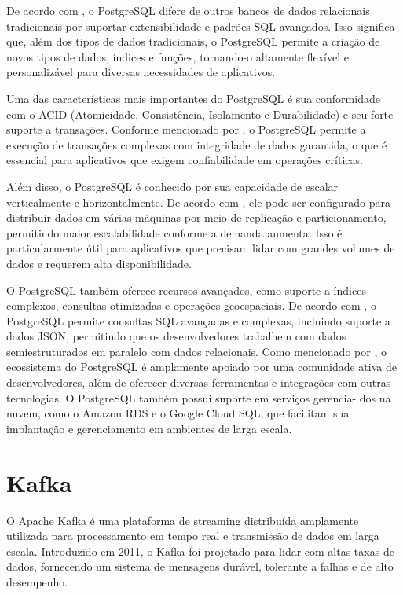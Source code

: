 De acordo com \cite{Momjian2001}, o PostgreSQL difere de outros bancos de dados
relacionais tradicionais por suportar extensibilidade e padrões SQL avançados. Isso significa que,
além dos tipos de dados tradicionais, o PostgreSQL permite a criação de novos tipos de dados,
índices e funções, tornando-o altamente flexível e personalizável para diversas necessidades de
aplicativos.

Uma das características mais importantes do PostgreSQL é sua conformidade com o
ACID (Atomicidade, Consistência, Isolamento e Durabilidade) e seu forte suporte a transações.
Conforme mencionado por \cite{stonebraker1986design}, o PostgreSQL permite a execução de
transações complexas com integridade de dados garantida, o que é essencial para aplicativos que
exigem confiabilidade em operações críticas.

Além disso, o PostgreSQL é conhecido por sua capacidade de escalar verticalmente
e horizontalmente. De acordo com \cite{stonebraker2010architecture}, ele pode ser configurado para
distribuir dados em várias máquinas por meio de replicação e particionamento, permitindo maior escalabilidade conforme a demanda aumenta. Isso é particularmente útil para aplicativos que
precisam lidar com grandes volumes de dados e requerem alta disponibilidade.

O PostgreSQL também oferece recursos avançados, como suporte a índices complexos,
consultas otimizadas e operações geoespaciais. De acordo com \cite{OBrien2016}, o PostgreSQL
permite consultas SQL avançadas e complexas, incluindo suporte a dados JSON, permitindo que
os desenvolvedores trabalhem com dados semiestruturados em paralelo com dados relacionais.
Como mencionado por \cite{pavlo2012comparison}, o ecossistema do PostgreSQL é amplamente
apoiado por uma comunidade ativa de desenvolvedores, além de oferecer diversas ferramentas e
integrações com outras tecnologias. O PostgreSQL também possui suporte em serviços gerencia-
dos na nuvem, como o Amazon RDS e o Google Cloud SQL, que facilitam sua implantação e
gerenciamento em ambientes de larga escala.

\section{Kafka}

O Apache Kafka é uma plataforma de streaming distribuída amplamente utilizada para processamento em tempo real e transmissão de dados em larga escala.
Introduzido em 2011, o Kafka foi projetado para lidar com altas taxas de dados, fornecendo um sistema de mensagens durável, tolerante a falhas e de alto desempenho.

